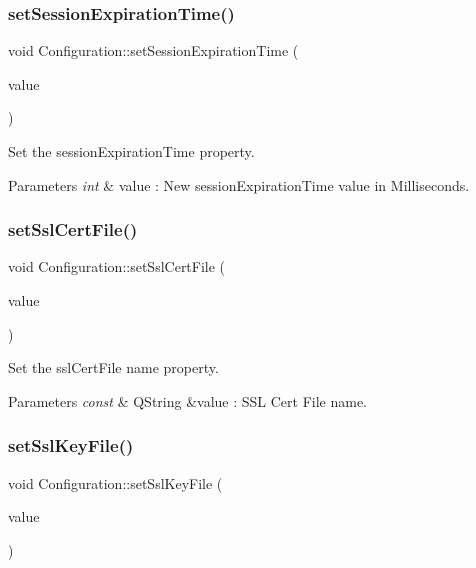\subsubsection{\texorpdfstring{set\+Session\+Expiration\+Time()}{setSessionExpirationTime()}}
{\footnotesize\ttfamily void Configuration\+::set\+Session\+Expiration\+Time (\begin{DoxyParamCaption}\item[{int}]{value }\end{DoxyParamCaption})}



Set the session\+Expiration\+Time property. 


\begin{DoxyParams}{Parameters}
{\em int} & value \+: New session\+Expiration\+Time value in Milliseconds. \\
\hline
\end{DoxyParams}
\mbox{\label{class_configuration_a16eecdd98ab2b9c4737f3178656bb3ad}} 
\subsubsection{\texorpdfstring{set\+Ssl\+Cert\+File()}{setSslCertFile()}}
{\footnotesize\ttfamily void Configuration\+::set\+Ssl\+Cert\+File (\begin{DoxyParamCaption}\item[{const Q\+String \&}]{value }\end{DoxyParamCaption})}



Set the ssl\+Cert\+File name property. 


\begin{DoxyParams}{Parameters}
{\em const} & Q\+String \&value \+: S\+SL Cert File name. \\
\hline
\end{DoxyParams}
\mbox{\label{class_configuration_a646d1ce1463b0519c745483a228c4949}} 
\subsubsection{\texorpdfstring{set\+Ssl\+Key\+File()}{setSslKeyFile()}}
{\footnotesize\ttfamily void Configuration\+::set\+Ssl\+Key\+File (\begin{DoxyParamCaption}\item[{const Q\+String \&}]{value }\end{DoxyParamCaption})}



